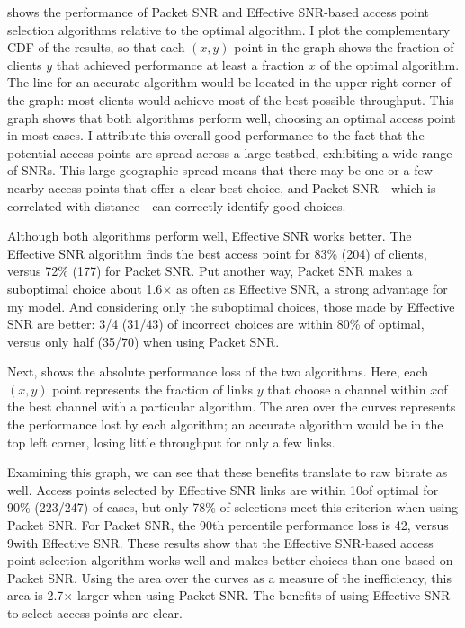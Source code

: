  shows the performance of Packet SNR and Effective SNR-based access point selection algorithms relative to the optimal algorithm. I plot the complementary CDF of the results, so that each $(x,y)$ point in the graph shows the fraction of clients $y$ that achieved performance at least a fraction $x$ of the optimal algorithm. The line for an accurate algorithm would be located in the upper right corner of the graph: most clients would achieve most of the best possible throughput.  This graph shows that both algorithms perform well, choosing an optimal access point in most cases. I attribute this overall good performance to the fact that the potential access points are spread across a large testbed, exhibiting a wide range of SNRs. This large geographic spread means that there may be one or a few nearby access points that offer a clear best choice, and Packet SNR---which is correlated with distance---can correctly identify good choices.

Although both algorithms perform well, Effective SNR works better. The Effective SNR algorithm finds the best access point for 83\% (204) of clients, versus 72\% (177) for Packet SNR. Put another way, Packet SNR makes a suboptimal choice about 1.6$\times$ as often as Effective SNR, a strong advantage for my model. And considering only the suboptimal choices, those made by Effective SNR are better: 3/4 (31/43) of incorrect choices are within 80\% of optimal, versus only half (35/70) when using Packet SNR.

Next,  shows the absolute performance loss of the two algorithms. Here, each $(x,y)$ point represents the fraction of links $y$ that choose a channel within $x$\Mbps of the best channel with a particular algorithm. The area over the curves represents the performance lost by each algorithm; an accurate algorithm would be in the top left corner, losing little throughput for only a few links.

Examining this graph, we can see that these benefits translate to raw bitrate as well. Access points selected by Effective SNR links are within 10\Mbps of optimal for 90\% (223/247) of cases, but only 78\% of selections meet this criterion when using Packet SNR. For Packet SNR, the 90th percentile performance loss is 42\Mbps, versus 9\Mbps with Effective SNR. These results show that the Effective SNR-based access point selection algorithm works well and makes better choices than one based on Packet SNR. Using the area over the curves as a measure of the inefficiency, this area is 2.7$\times$ larger when using Packet SNR. The benefits of using Effective SNR to select access points are clear.


